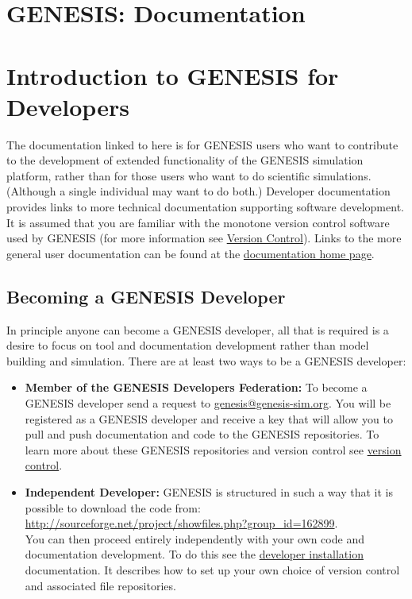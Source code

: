 \documentclass[12pt]{article}
\begin{document}
\section*{GENESIS: Documentation}

\section*{Introduction to GENESIS for Developers}

The documentation linked to here is for GENESIS users who want to contribute to the development of extended functionality of the GENESIS simulation platform, rather than for those users who want to do scientific simulations. (Although a single individual may want to do both.) Developer documentation provides links to more technical documentation supporting software development. It is assumed that you are familiar with the monotone version control software used by GENESIS (for more information see \href{../version-control/version-control.tex}{Version Control}). Links to the more general user documentation can be found at the \href{../documentation-homepage/documentation-homepage.tex}{documentation home page}. 

\subsection*{Becoming a GENESIS Developer}

In principle anyone can become a GENESIS developer, all that is required is a desire to focus on tool and documentation development rather than model building and simulation. There are at least two ways to be a GENESIS  developer:

\begin{itemize}
	\item {\bf Member of the GENESIS Developers Federation:} To become a GENESIS developer send a request to 
	\href{mailto:genesis@genesis-sim.org}{genesis@genesis-sim.org}. You will be registered as a GENESIS developer 
	and receive a key that will allow you to pull and push documentation and code to the GENESIS repositories. To learn more 
	about these GENESIS repositories and version control see \href{../version-control/version-control.tex}{version control}.
	
	\item {\bf Independent Developer:} GENESIS is structured in such a way that it is possible to download the code from:\\
	\href{http://sourceforge.net/project/showfiles.php?group_id=162899}{http://sourceforge.net/project/showfiles.php?group\_id=162899}.\\
	You can then proceed entirely independently with your own code and documentation development. To do this see the 
	\href{../installation-developer/installation-developer.tex}{developer installation} documentation. It describes how to set up your own 
	choice of version control and associated file repositories.

\end{itemize}
\end{document}
